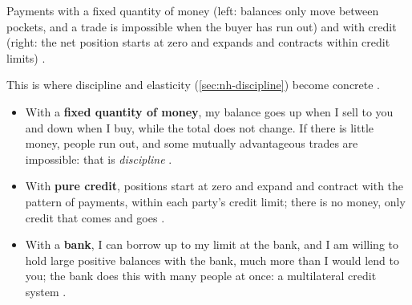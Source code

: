 \begin{paracol}{2}
\begin{nfigure}
\caption{Payments with a fixed quantity of money (left: balances only move between pockets, and a trade is impossible when the buyer has
run out) and with credit (right: the net position starts at zero and expands and contracts within credit limits)
.}\label{fig:mv-de}
\end{nfigure}

This is where discipline and elasticity (\cref{sec:nh-discipline}) become concrete .
\begin{itemize}
  \item With a \textbf{fixed quantity of money}, my balance goes up when I sell to you and down when I buy, while the total does not
        change. If there is little money, people run out, and some mutually advantageous trades are impossible: that is
        \emph{discipline} .
  \item With \textbf{pure credit}, positions start at zero and expand and contract with the pattern of payments, within each party's credit
        limit; there is no money, only credit that comes and goes .
  \item With a \textbf{bank}, I can borrow up to my limit at the bank, and I am willing to hold large positive balances with the bank, much
        more than I would lend to you; the bank does this with many people at once: a multilateral credit system
        .
\end{itemize}


\end{paracol}
